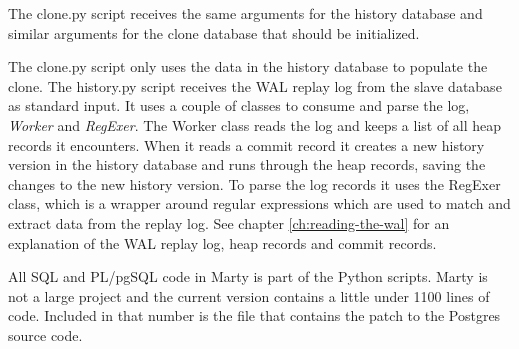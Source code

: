 The clone.py script receives the same arguments for the history database and similar arguments for the clone database that should be initialized.

The clone.py script only uses the data in the history database to populate the clone.
The history.py script receives the WAL replay log from the slave database as standard input.
It uses a couple of classes to consume and parse the log, \textit{Worker} and \textit{RegExer}.
The Worker class reads the log and keeps a list of all heap records it encounters.
When it reads a commit record it creates a new history version in the history database and runs through the heap records, saving the changes to the new history version.
To parse the log records it uses the RegExer class, which is a wrapper around regular expressions which are used to match and extract data from the replay log.
See chapter \ref{ch:reading-the-wal} for an explanation of the WAL replay log, heap records and commit records.

All SQL and PL/pgSQL code in Marty is part of the Python scripts.
Marty is not a large project and the current version contains a little under 1100 lines of code.
Included in that number is the file that contains the patch to the Postgres source code.

